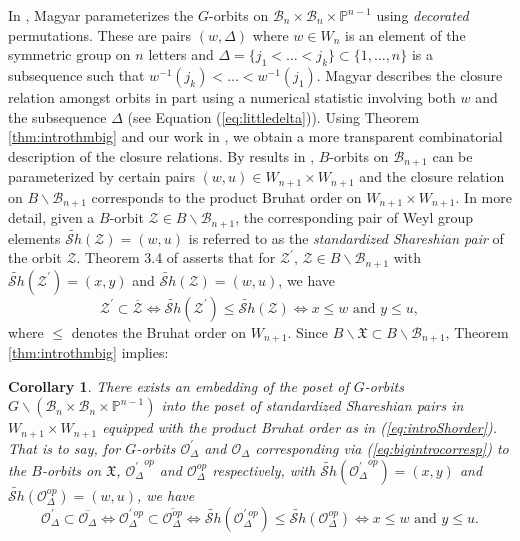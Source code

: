 \documentclass[12pt]{amsart}
\numberwithin{equation}{section}
\newtheorem{cor}[thm]{Corollary}
\newcommand{\cZ}{{\mathcal Z}}
\newcommand{\B}{\mathcal{B}}
\newcommand{\Sh}{\mathcal{S}h}
\newcommand{\calO}{\mathcal{O}}
\begin{document}
In \cite{Magyar}, Magyar parameterizes the $G$-orbits on $\B_{n}\times\B_{n}\times\mathbb{P}^{n-1}$ using \emph{decorated} permutations.  These are pairs $(w,\Delta)$ where $w\in W_{n}$ is an element of the symmetric group on $n$ letters and $\Delta=\{j_{1}<\dots <j_{k}\}\subset \{1,\dots, n\}$ is a subsequence such that $w^{-1}(j_{k})<\dots<w^{-1}(j_{1})$.  Magyar describes the closure relation amongst orbits in part using a numerical statistic involving both $w$ and the subsequence $\Delta$ (see Equation (\ref{eq:littledelta})).  Using Theorem \ref{thm:introthmbig} and our work in \cite{Shpairs}, we obtain a more transparent combinatorial description of the closure relations.  By results in \cite{Shpairs}, $B$-orbits on $\B_{n+1}$ can be parameterized by certain pairs $(w, u)\in W_{n+1}\times W_{n+1}$ and the closure relation on $B\backslash\B_{n+1}$ corresponds to the product Bruhat order on $W_{n+1}\times W_{n+1}$.  In more detail, given a $B$-orbit $\cZ\in B\backslash\B_{n+1}$, the corresponding pair of Weyl group elements $\widetilde{\Sh}(\cZ)=(w, u)$ is referred to as the \emph{standardized Shareshian pair} of the orbit $\cZ$. Theorem 3.4 of \cite{Shpairs} asserts that for $\cZ^{\prime},\, \cZ\in B\backslash\B_{n+1}$ with $\widetilde{\Sh}(\cZ^{\prime})=(x,y)$ and $\widetilde{\Sh}(\cZ)=(w,u)$, we have 
\begin{equation}\label{eq:introShorder}
\cZ^{\prime}\subset\overline{\cZ}\Leftrightarrow \widetilde{\Sh}(\cZ^{\prime})\leq \widetilde{\Sh}(\cZ)\Leftrightarrow x\leq w\mbox{ and } y\leq u,
\end{equation}
where $\leq$ denotes the Bruhat order on $W_{n+1}$.  Since $B\backslash\mathfrak{X}\subset B\backslash \B_{n+1}$, Theorem \ref{thm:introthmbig} implies:
\begin{cor}\label{c:introcor}
There exists an embedding of the poset of $G$-orbits $G\backslash(\B_{n}\times\B_{n}\times \mathbb{P}^{n-1})$ into the poset of standardized Shareshian pairs in $W_{n+1}\times W_{n+1}$ equipped with the product Bruhat order as in (\ref{eq:introShorder}).  That is to say, for $G$-orbits $\mathcal{O}_{\Delta}^{\prime}$ and $\mathcal{O}_{\Delta}$ corresponding via (\ref{eq:bigintrocorresp}) to the $B$-orbits on $\mathfrak{X}$, ${\mathcal{O}_{\Delta}^{\prime}}^{op}$ and $\mathcal{O}_{\Delta}^{op}$ respectively, with $\widetilde{\Sh}({\mathcal{O}_{\Delta}^{\prime}}^{op})=(x,y)$ and $\widetilde{\Sh}(\mathcal{O}_{\Delta}^{op})=(w,u)$, we have 
$$
\calO_{\Delta}^{\prime}\subset\overline{\calO_{\Delta}}\Leftrightarrow\calO_{\Delta}^{\prime\, op}\subset\overline{\calO_{\Delta}^{op}}\Leftrightarrow\widetilde{\Sh}(\mathcal{O}_{\Delta}^{\prime\, op})\leq \widetilde{\Sh}(\mathcal{O}_{\Delta}^{op})\Leftrightarrow x\leq w\mbox{ and } y\leq u.
$$   
\end{cor}
\end{document}
